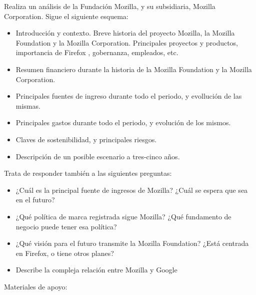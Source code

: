 \documentclass[a4paper,12pt]{article}
\begin{document}
Realiza un análisis de la Fundación Mozilla, y su subsidiaria, Mozilla Corporation. Sigue el siguiente esquema:

\begin{itemize}
\item Introducción y contexto. Breve historia del proyecto Mozilla, la Mozilla Foundation y la Mozilla Corporation. Principales proyectos y productos, importancia de Firefox , gobernanza, empleados, etc.
\item Resumen financiero durante la historia de la Mozilla Foundation y la Mozilla Corporation.
\item Principales fuentes de ingreso durante todo el periodo, y evollución de las mismas.
\item Principales gastos durante todo el periodo, y evolución de los mismos.
\item Claves de sostenibilidad, y principales riesgos.
\item Descripción de un posible escenario a tres-cinco años.
\end{itemize}

Trata de responder también a las siguientes preguntas:

\begin{itemize}
\item ¿Cuál es la principal fuente de ingresos de Mozilla? ¿Cuál se espera que sea en el futuro?
\item ¿Qué política de marca registrada sigue Mozilla? ¿Qué fundamento de negocio puede tener esa política?
\item ¿Qué visión para el futuro transmite la Mozilla Foundation? ¿Está centrada en Firefox, o tiene otros planes?
\item Describe la compleja relación entre Mozilla y Google
\end{itemize}

Materiales de apoyo:
\end{document}
